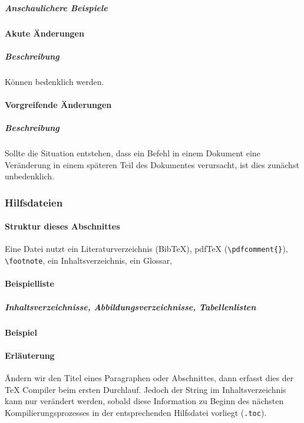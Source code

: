 \subparagraph*{Anschaulichere Beispiele}

\paragraph*{Akute Änderungen}
\subparagraph*{Beschreibung}
Können bedenklich werden.


\paragraph*{Vorgreifende Änderungen}
\subparagraph*{Beschreibung}
Sollte die Situation entstehen, dass ein Befehl in einem Dokument eine Veränderung in einem späteren Teil des Dokumentes verursacht, ist dies zunächst unbedenklich.



\subsubsection{Hilfsdateien}%

\paragraph{Struktur dieses Abschnittes}
Eine Datei nutzt ein Literaturverzeichnis (Bib\TeX{}), pdf\TeX{} (\verb|\pdfcomment{}|), \verb|\footnote|, ein Inhaltsverzeichnis, ein Glossar, 

\paragraph{Beispielliste}
\subparagraph*{Inhaltsverzeichnisse, Abbildungsverzeichnisse, Tabellenlisten}
\paragraph*{Beispiel}
\paragraph*{Erläuterung}
Ändern wir den Titel eines Paragraphen oder Abschnittes, dann erfasst dies der \TeX{} Compiler beim ersten Durchlauf. Jedoch der String im Inhaltsverzeichnis kann nur verändert werden, sobald diese Information zu Beginn des nächsten Kompilierungsprozesses in der entsprechenden Hilfsdatei vorliegt (\texttt{.toc}).

